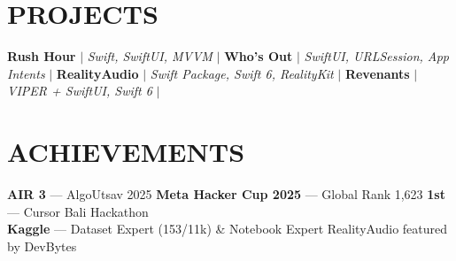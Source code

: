 \section{PROJECTS}
    \resumeSubHeadingListStart
        \resumeProjectHeading
          {\textbf{Rush Hour} $|$ \emph{Swift, SwiftUI, MVVM} $|$ \href{https://github.com/bhanage-viraj/RushHour}{} \hspace{2pt} \href{https://rush-hour-rho.vercel.app}{}}{}
          \resumeItemListStart
          \resumeItemListEnd
        \resumeProjectHeading
          {\textbf{Who's Out} $|$ \emph{SwiftUI, URLSession, App Intents} $|$ \href{https://github.com/bhanage-viraj/Whos-Out}{} \hspace{2pt} \href{https://testflight.apple.com/join/avevSG7f}{}}{}
          \resumeItemListStart
          \resumeItemListEnd
        \resumeProjectHeading
          {\textbf{RealityAudio} $|$ \emph{Swift Package, Swift 6, RealityKit} $|$ \href{https://github.com/bhanage-viraj/RealityAudio}{}}{}
          \resumeItemListStart
          \resumeItemListEnd
        \resumeProjectHeading
          {\textbf{Revenants} $|$ \emph{VIPER + SwiftUI, Swift 6} $|$ \href{https://github.com/bhanage-viraj/Split-Mechanics}{} \hspace{2pt} \href{https://testflight.apple.com/join/bxqH2nP9}{}}{}
          \resumeItemListStart
          \resumeItemListEnd
    \resumeSubHeadingListEnd

\section{ACHIEVEMENTS}
 \begin{itemize}[leftmargin=0in, label={}, itemsep=0pt, topsep=1pt]
    \small{\item{
     \textbf{AIR 3} --- AlgoUtsav 2025 \hspace{8pt} \textbf{Meta Hacker Cup 2025} --- Global Rank 1,623 \hspace{8pt} \textbf{1st} --- Cursor Bali Hackathon \\
     \textbf{Kaggle} --- Dataset Expert (153/11k) \& Notebook Expert \hspace{8pt} RealityAudio featured by DevBytes
    }}
 \end{itemize}

